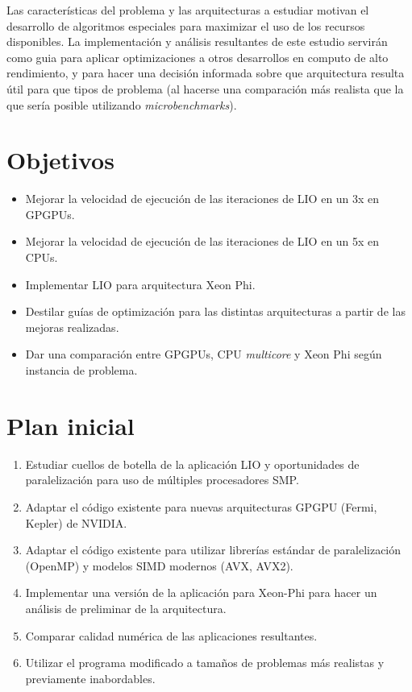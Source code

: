 \documentclass[a4paper, 12pt]{article}
\begin{document}
Las caracter\'isticas del problema y las arquitecturas a estudiar motivan el desarrollo de algoritmos especiales para maximizar el uso de los
recursos disponibles. La implementaci\'on y an\'alisis resultantes de este estudio servir\'an como guia para aplicar optimizaciones a otros
desarrollos en computo de alto rendimiento, y para hacer una decisi\'on informada sobre que arquitectura resulta \'util para que tipos de problema
(al hacerse una comparaci\'on m\'as realista que la que ser\'ia posible utilizando \textit{microbenchmarks}).

\section*{Objetivos}

\begin{itemize}
\item Mejorar la velocidad de ejecuci\'on de las iteraciones de LIO en un 3x en GPGPUs.

\item Mejorar la velocidad de ejecuci\'on de las iteraciones de LIO en un 5x en CPUs.

\item Implementar LIO para arquitectura Xeon Phi.

\item Destilar gu\'ias de optimizaci\'on para las distintas arquitecturas a partir de las mejoras realizadas.

\item Dar una comparaci\'on entre GPGPUs, CPU \textit{multicore} y Xeon Phi seg\'un instancia de problema.
\end{itemize}

\section*{Plan inicial}

\begin{enumerate}

\item Estudiar cuellos de botella de la aplicaci\'on LIO y oportunidades de paralelizaci\'on para uso de m\'ultiples procesadores SMP.

\item Adaptar el c\'odigo existente para nuevas arquitecturas GPGPU (Fermi, Kepler) de NVIDIA.

\item Adaptar el c\'odigo existente para utilizar librer\'ias est\'andar de paralelizaci\'on (OpenMP) y modelos SIMD modernos (AVX, AVX2).

\item Implementar una versi\'on de la aplicaci\'on para Xeon-Phi para hacer un an\'alisis de preliminar de la arquitectura.

\item Comparar calidad num\'erica de las aplicaciones resultantes.

\item Utilizar el programa modificado a tama\~nos de problemas m\'as realistas y previamente inabordables.

\end{enumerate}
\end{document}
